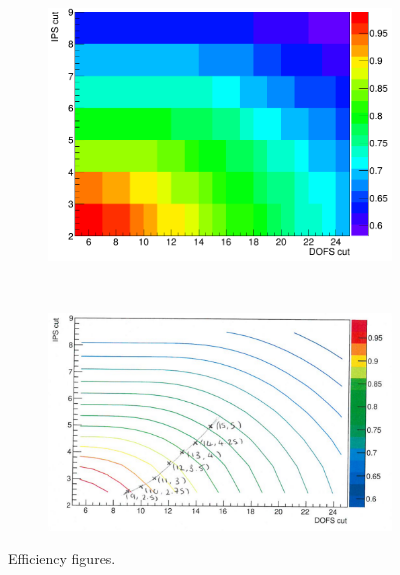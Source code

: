 \begin{figure}
    \centering
    \begin{subfigure}[b]{0.4\textwidth}
        \includegraphics[width=\textwidth]{./Figs/Selection/strip_chart.png}
        \caption{ }
        \label{fig:eff}
    \end{subfigure}
    ~ %
    \begin{subfigure}[b]{0.4\textwidth}
        \includegraphics[width=\textwidth]{./Figs/Selection/strip_chart1.png}
        \caption{ }
        \label{fig:eff_contours}
    \end{subfigure}
    \caption{Efficiency figures.}
    \label{fig:efficiencyplots}
\end{figure}

